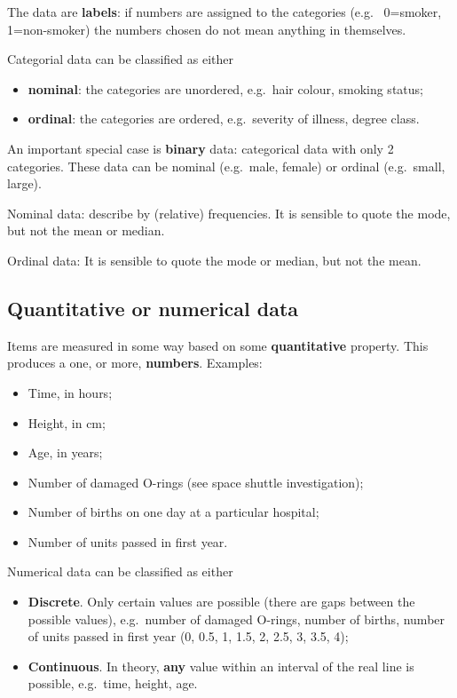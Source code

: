 \documentclass[
  british,
]{book}
\providecommand{\tightlist}{%
  \setlength{\itemsep}{0pt}\setlength{\parskip}{0pt}}
\begin{document}
The data are \textbf{labels}: if numbers are assigned to the categories (e.g.~
0=smoker, 1=non-smoker) the numbers chosen do not mean anything in themselves.

Categorial data can be classified as either

\begin{itemize}
\tightlist
\item
  \textbf{nominal}: the categories are unordered, e.g.~hair colour, smoking status;
\item
  \textbf{ordinal}: the categories are ordered, e.g.~severity of illness, degree class.
\end{itemize}

An important special case is \textbf{binary} data: categorical data with only 2 categories. These data can be nominal (e.g.~male, female) or ordinal (e.g.~small, large).

Nominal data: describe by (relative) frequencies. It is sensible to quote the mode, but not the mean or median.

Ordinal data: It is sensible to quote the mode or median, but not the mean.

\hypertarget{quantitative-or-numerical-data}{%
\subsection{Quantitative or numerical data}\label{quantitative-or-numerical-data}}

Items are measured in some way based on some \textbf{quantitative} property. This produces a one, or more, \textbf{numbers}. Examples:

\begin{itemize}
\tightlist
\item
  Time, in hours;
\item
  Height, in cm;
\item
  Age, in years;
\item
  Number of damaged O-rings (see space shuttle investigation);
\item
  Number of births on one day at a particular hospital;
\item
  Number of units passed in first year.
\end{itemize}

Numerical data can be classified as either

\begin{itemize}
\tightlist
\item
  \textbf{Discrete}. Only certain values are possible (there are gaps between the possible values), e.g.~number of damaged O-rings, number of births, number of units passed in first year (0, 0.5, 1, 1.5, 2, 2.5, 3, 3.5, 4);
\item
  \textbf{Continuous}. In theory, \textbf{any} value within an interval of the real line
  is possible, e.g.~time, height, age.
\end{itemize}
\end{document}
